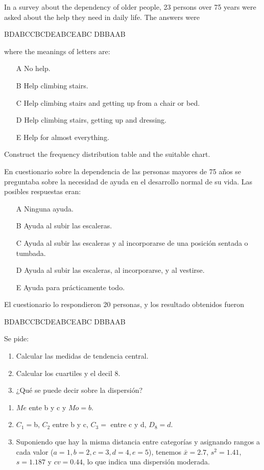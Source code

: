 {In a survey about the dependency of older people, 23 persons over 75 years were asked about the help they need in
daily life.
The answers were
\begin{center}
B\quad D\quad A\quad B\quad C\quad C\quad B\quad C\quad D\quad E\quad A\quad B\quad C\quad E\quad A\quad B\quad C\quad
D\quad B\quad B\quad A\quad A\quad B
\end{center}

where the meanings of letters are:
\begin{enumerate}
\item[A] No help.
\item[B] Help climbing stairs.
\item[C] Help climbing stairs and getting up from a chair or bed.
\item[D] Help climbing stairs, getting up and dressing.
\item[E] Help for almost everything.
\end{enumerate}

Construct the frequency distribution table and the suitable chart.
}
{
}
{}


{En cuestionario sobre la dependencia de las personas mayores de 75 años se preguntaba sobre la necesidad de ayuda en el desarrollo normal de su vida. Las posibles respuestas eran:
\begin{enumerate}
\item[A] Ninguna ayuda.
\item[B] Ayuda al subir las escaleras.
\item[C] Ayuda al subir las escaleras y al incorporarse de una posición sentada o tumbada.
\item[D] Ayuda al subir las escaleras, al incorporarse, y al vestirse.
\item[E] Ayuda para prácticamente todo.
\end{enumerate}
El cuestionario lo respondieron 20 personas, y los resultado obtenidos fueron
\begin{center}
B\quad D\quad A\quad B\quad C\quad C\quad B\quad C\quad D\quad E\quad A\quad B\quad C\quad E\quad A\quad B\quad C\quad
D\quad B\quad B\quad A\quad A\quad B
\end{center}
Se pide:
\begin{enumerate}
\item Calcular las medidas de tendencia central.
\item Calcular los cuartiles y el decil 8.
\item ¿Qué se puede decir sobre la dispersión?
\end{enumerate}
}
{\begin{enumerate}
\item $Me$ ente b y c y $Mo=b$.
\item $C_1=$b, $C_2$ entre b y c, $C_3=$ entre c y d, $D_8=d$.
\item Suponiendo que hay la misma distancia entre categorías y asignando rangos a cada valor ($a=1,b=2,c=3,d=4,e=5$), tenemos $\bar x=2.7$, $s^2=1.41$, $s=1.187$ y $cv=0.44$, lo que indica una dispersión moderada.
\end{enumerate}
}
{}


